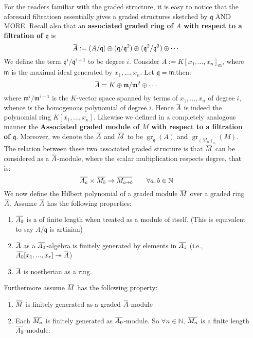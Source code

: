 \documentclass[12pt]{article}
\theoremstyle{definition}
\theoremstyle{plain}
\DeclareMathOperator{\gr}{gr}
\newcommand{\nat}{\mathbb{N}}
\newcommand{\surj}{\twoheadrightarrow}
\newcommand{\overbar}[1]{\mkern 1.5mu\overline{\mkern-1.5mu#1\mkern-1.5mu}\mkern 1.5mu}
\renewcommand{\bar}{\overbar}
\begin{document}
\medskip
For the readers familiar with the graded structure, it is easy to notice that the aforesaid filtratiosn essentially gives a graded structures sketched by $\mathfrak{q}$ AND MORE. Recall also that an \textbf{associated graded ring of $A$ with respect to a filtration of $\mathfrak{q}$} is
\[\bar{A}:=(A/\mathfrak{q})\oplus (\mathfrak{q}/\mathfrak{q}^2)\oplus (\mathfrak{q}^2/\mathfrak{q}^3)\oplus \cdots\]
We define the term $\mathfrak{q}^i/\mathfrak{q}^{i+1}$ to be degree $i$.
\Exe Consider $A:=K[x_1, ..., x_n]_\mathfrak{m}$, where $\mathfrak{m}$ is the maximal ideal generated by $x_1, ..., x_n$. Let $\mathfrak{q}=\mathfrak{m}$.then:
\[\bar{A}=K\oplus \mathfrak{m}/\mathfrak{m}^2 \oplus \cdots\]
where $\mathfrak{m}^i/\mathfrak{m}^{i+1}$ is the $K$-vector space spanned by terms of $x_1, ..., x_n$ of degree $i$, whence is the homogenous polynomial of degree $i$. Hence $\bar{A}$ is indeed the polynomial ring $K[x_1, ..., x_n]$.
\Def Likewise we defined in a completely analogous manner the \textbf{Associated graded module of $M$ with respect to a filtration of $\mathfrak{q}$}. Moreover, we denote the $\bar{A}$ and $\bar{M}$ to be $\gr_\mathfrak{q}(A)$ and $\gr_{(M_n)_n}(M)$.
\Rmk The relation between these two associated graded structure is that $\bar{M}$ can be considered as a $\bar{A}$-module, where the scalar multiplication respects degree, that is:
\[\bar{A_a}\times \bar{M_b}\to  \bar{M_{a+b}} \qquad \forall a, b\in \nat\]
We now define the Hilbert polynomial of a graded module $\bar{M}$ over a graded ring $\bar{A}$. Assume $\bar{A}$ has the following properties:
\begin{enumerate}
  \item $\bar{A_0}$ is a of finite length when treated as a module of itself. (This is equivalent to say $A/\mathfrak{q}$ is artinian)
  \item $\bar{A}$ as a $\bar{A_0}$-algebra is finitely generated by elements in $\bar{A_1}$ (i.e., $\bar{A_0}[x_1, ..., x_r]\surj \bar{A}$)
  \item $\bar{A}$ is noetherian as a ring.
\end{enumerate}
Furthermore assume $\bar{M}$ has the following property:
\begin{enumerate}
  \item $\bar{M}$ is finitely generated as a graded $\bar{A}$-module
  \item Each $\bar{M_n}$ is finitely generated as $\bar{A_0}$-module.  So $\forall n\in \nat$, $\bar{M_n}$ is a finite length $\bar{A_0}$-module.
\end{enumerate}
\end{document}
